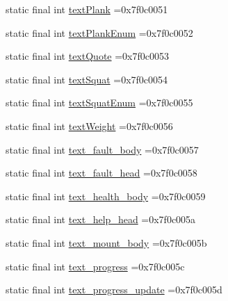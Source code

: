 \begin{DoxyCompactItemize}
\item 
static final int \mbox{\hyperlink{classcom_1_1example_1_1trainawearapplication_1_1_r_1_1string_a66955d348d48ffe12771f7d52108943a}{text\+Plank}} =0x7f0c0051
\item 
static final int \mbox{\hyperlink{classcom_1_1example_1_1trainawearapplication_1_1_r_1_1string_adf29c9a0f9c606057258fd14f1874855}{text\+Plank\+Enum}} =0x7f0c0052
\item 
static final int \mbox{\hyperlink{classcom_1_1example_1_1trainawearapplication_1_1_r_1_1string_a6ad88dee3572a4e483a7ee9fccaff94e}{text\+Quote}} =0x7f0c0053
\item 
static final int \mbox{\hyperlink{classcom_1_1example_1_1trainawearapplication_1_1_r_1_1string_a384950327980583cc3758a21ee0ebf14}{text\+Squat}} =0x7f0c0054
\item 
static final int \mbox{\hyperlink{classcom_1_1example_1_1trainawearapplication_1_1_r_1_1string_a0cba505d1bf2624321c90d9758c7b025}{text\+Squat\+Enum}} =0x7f0c0055
\item 
static final int \mbox{\hyperlink{classcom_1_1example_1_1trainawearapplication_1_1_r_1_1string_a63ba304b5e5ae14d92cede7f9ba46f2a}{text\+Weight}} =0x7f0c0056
\item 
static final int \mbox{\hyperlink{classcom_1_1example_1_1trainawearapplication_1_1_r_1_1string_af9fa67aadee4239f68aff09dd4b17eb3}{text\+\_\+fault\+\_\+body}} =0x7f0c0057
\item 
static final int \mbox{\hyperlink{classcom_1_1example_1_1trainawearapplication_1_1_r_1_1string_a153412935561036ec17a951c77a9468b}{text\+\_\+fault\+\_\+head}} =0x7f0c0058
\item 
static final int \mbox{\hyperlink{classcom_1_1example_1_1trainawearapplication_1_1_r_1_1string_a9ac2630a747b4da4ea4c6d1626e062c5}{text\+\_\+health\+\_\+body}} =0x7f0c0059
\item 
static final int \mbox{\hyperlink{classcom_1_1example_1_1trainawearapplication_1_1_r_1_1string_a07955e072e72930b56df132fc8263526}{text\+\_\+help\+\_\+head}} =0x7f0c005a
\item 
static final int \mbox{\hyperlink{classcom_1_1example_1_1trainawearapplication_1_1_r_1_1string_af26e7a67bc7f87776077b2556272375c}{text\+\_\+mount\+\_\+body}} =0x7f0c005b
\item 
static final int \mbox{\hyperlink{classcom_1_1example_1_1trainawearapplication_1_1_r_1_1string_a3ec499b259b1a88285c25fa8bd4845a8}{text\+\_\+progress}} =0x7f0c005c
\item 
static final int \mbox{\hyperlink{classcom_1_1example_1_1trainawearapplication_1_1_r_1_1string_a491ed7a84403289cf7e65828f1f6c41e}{text\+\_\+progress\+\_\+update}} =0x7f0c005d

\end{DoxyCompactItemize}
